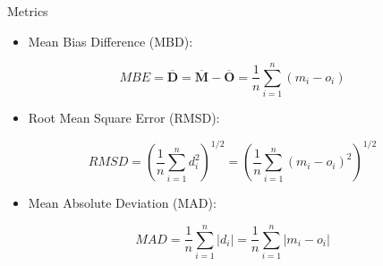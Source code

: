 \documentclass[xcolor={usenames,svgnames,dvipsnames}]{beamer}
\begin{document}
\begin{frame}[label={sec:org0c23f45}]{Metrics}
\begin{itemize}
\item Mean Bias Difference (MBD):
\end{itemize}
\[
MBE = \overline{\mathbf{D}} = \overline{\mathbf{M}} - \overline{\mathbf{O}} = \frac{1}{n} \sum_{i=1}^n (m_i - o_i)
\]

\begin{itemize}
\item Root Mean Square Error (RMSD):
\end{itemize}
\[
RMSD = \left(\frac{1}{n} \sum_{i=1}^n d_i^2 \right)^{1/2} =  \left( \frac{1}{n} \sum_{i=1}^n (m_i - o_i)^2  \right)^{1/2}
\]

\begin{itemize}
\item Mean Absolute Deviation (MAD):
\end{itemize}

\[
MAD = \frac{1}{n} \sum_{i=1}^n \left|d_i\right| =  \frac{1}{n} \sum_{i=1}^n \left|m_i - o_i\right|
\]
\end{frame}
\end{document}
